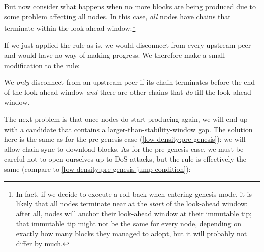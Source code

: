 But now consider what happens when no more blocks are being produced due to some
problem affecting all nodes. In this case, \emph{all} nodes have chains that
terminate within the look-ahead window:\footnote{ In fact, if we decide to
execute a roll-back when entering genesis mode, it is likely that all nodes
terminate near at the \emph{start} of the look-ahead window: after all, nodes
will anchor their look-ahead window at their immutable tip; that immutable tip
might not be the same for every node, depending on exactly how many blocks they
managed to adopt, but it will probably not differ by much.}
%
\begin{center}
\end{center}
%

If we just applied the rule as-is, we would disconnect from every upstream peer
and would have no way of making progress. We therefore make a small modification
to the rule:

\begin{definition}
We \emph{only} disconnect from an upstream peer if its chain terminates before
the end of the look-ahead window \emph{and} there are other chains that
\emph{do} fill the look-ahead window.
\end{definition}

The next problem is that once nodes do start producing again, we will end up
with a candidate that contains a larger-than-stability-window gap. The solution
here is the same as for the pre-genesis case (\cref{low-density:pre-genesis}):
we will allow chain sync to download blocks. As for the pre-genesis case, we
must be careful not to open ourselves up to DoS attacks, but the rule is
effectively the same (compare to \cref{low-density:pre-genesis-jump-condition}):

